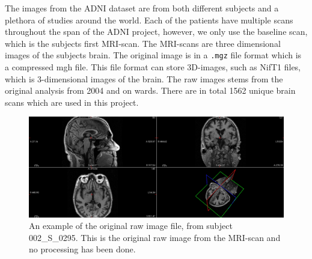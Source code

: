 \documentclass[12pt, fleqn, titlepage]{article}
\begin{document}

The images from the ADNI dataset are from both different subjects and a plethora of studies around the world. 
Each of the patients have multiple scans throughout the span of the ADNI project, however, we only use the baseline scan, which is the subjects first MRI-scan. 
The MRI-scans are three dimensional images of the subjects brain. 
The original image is in a \texttt{.mgz} file format which is a compressed mgh file. 
This file format can store 3D-images, such as NifT1 files, which is 3-dimensional images of the brain. 
The raw images stems from the original analysis from 2004 and on wards. 
There are in total 1562 %
unique brain scans which are used in this project.

\begin{figure}[H]
	\centering
	\includegraphics[width=0.95\linewidth]{mymans2}
	\caption{An example of the original raw image file, from subject 002\_S\_0295. This is the original raw image from the MRI-scan and no processing has been done.}
	\label{fig:screenshot001}
\end{figure}



\end{document}
